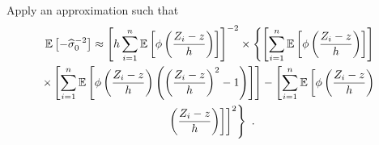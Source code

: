 Apply an approximation such that
\begin{multline}
  \operatorname{\mathbb{E}}\left[-\widehat{\sigma}_0^{-2}\right]
  \approx
  \left[
    h\sum_{i=1}^n
    \operatorname{\mathbb{E}}\left[\phi\left(
      \dfrac{
        Z_i-z
      }
      {
        h
      }
    \right)\right]
  \right]^{-2}
  \times
  \left\{
    \left[
      \sum_{i=1}^n
      \operatorname{\mathbb{E}}\left[
      \phi\left(
        \dfrac{
          Z_i-z
        }
        {
          h
        }
      \right)\right]
    \right]
  \right.
  \\
  \left.
    \times
    \left[
      \sum_{i=1}^n
      \operatorname{\mathbb{E}}\left[
      \phi\left(
        \dfrac{
          Z_i-z
        }
        {
          h
        }
      \right)
      \left(
        \left(
          \dfrac{
            Z_i-z
          }
          {
            h
          }
        \right)^2
        -1
      \right)
    \right]\right]
    -
    \left[
      \sum_{i=1}^n
      \operatorname{\mathbb{E}}\left[\phi\left(
        \dfrac{
          Z_i-z
        }
        {
          h
        }
      \right)
    \right.\right.
  \right.
  \\
  \left.
    \left.\left.
      \left(
        \dfrac{
          Z_i-z
        }
        {
          h
        }
      \right)\right]
    \right]^2
  \right\}
  \ .
  \label{eq:appendix_expectationNullStd}
\end{multline}

